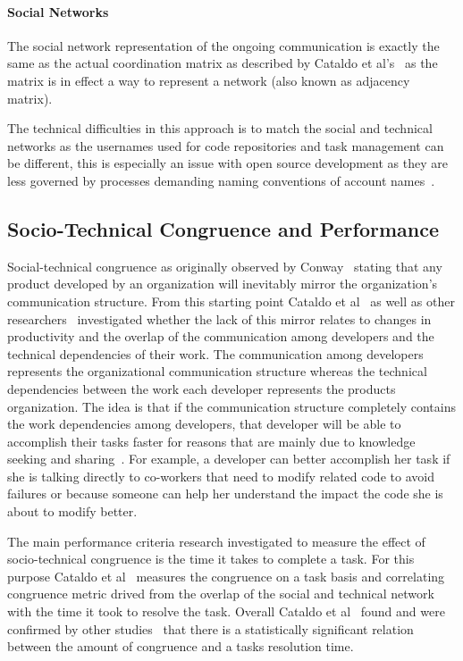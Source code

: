 \paragraph{Social Networks}
The social network representation of the ongoing communication is exactly the same as the actual coordination matrix as described by Cataldo et al's~\cite{cataldo:cscw:2006} as the matrix is in effect a way to represent a network (also known as adjacency matrix).

The technical difficulties in this approach is to match the social and technical networks as the usernames used for code repositories and task management can be different, this is especially an issue with open source development as they are less governed by processes demanding naming conventions of account names~\cite{schroeter:isese:2006}.

\subsection{Socio-Technical Congruence and Performance}
Social-technical congruence as originally observed by Conway~\cite{conway:datamination:1968} stating that any product developed by an organization will inevitably mirror the organization's communication structure.
From this starting point Cataldo et al~\cite{cataldo:cscw:2006} as well as other researchers~\cite{valetto:msr:2007,ducheneaut:cscw:2005,ehrlich:stc:2008} investigated whether the lack of this mirror relates to changes in productivity and the overlap of the communication among developers and the technical dependencies of their work.
The communication among developers represents the organizational communication structure whereas the technical dependencies between the work each developer represents the products organization.
The idea is that if the communication structure completely contains the work dependencies among developers, that developer will be able to accomplish their tasks faster for reasons that are mainly due to knowledge seeking and sharing~\cite{desouza2006:knowledge}.
For example, a developer can better accomplish her task if she is talking directly to co-workers that need to modify related code to avoid failures or because someone can help her understand the impact the code she is about to modify better.

The main performance criteria research investigated to measure the effect of socio-technical congruence is the time it takes to complete a task.
For this purpose Cataldo et al~\cite{cataldo:cscw:2006} measures the congruence on a task basis and correlating congruence metric drived from the overlap of the social and technical network with the time it took to resolve the task.
Overall Cataldo et al~\cite{cataldo:cscw:2006} found and were confirmed by other studies~\cite{valetto:msr:2007,ehrlich:stc:2008} that there is a statistically significant relation between the amount of congruence and a tasks resolution time.

